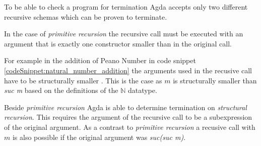 To be able to check a program for termination Agda accepts only two different recursive schemas which can be proven to terminate.

In the case of \emph{primitive recursion} the recursive call must be executed with an argument that is exactly one constructor smaller than in the original call.

For example in the addition of Peano Number in code snippet \ref{codeSnippet:natural_number_addition} the arguments used in the recusive call have to be structurally smaller \cite{norell:deptyped}. 
This is the case as $m$ is structurally smaller than \emph{suc m} based on the definitions of the $\mathbb{N}$ datatype.

Beside \emph{primitive recursion} Agda is able to determine termination on \emph{structural recursion}.
This requires the argument of the recursive call to be a subexpression of the original argument.
As a contrast to \emph{primitive recursion} a recusive call with $m$ is also possible if the original argument was \emph{suc(suc m)}.